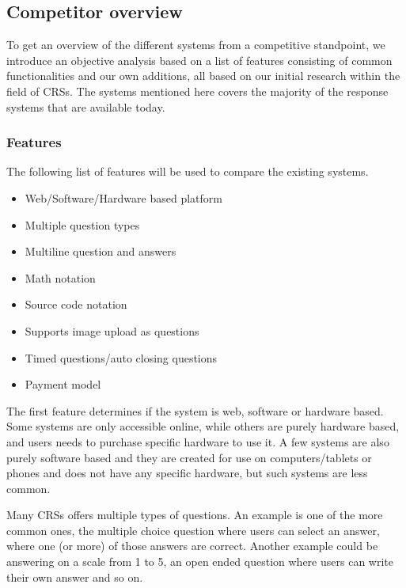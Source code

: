 \subsection{Competitor overview}\label{sec:competitor-overview}
To get an overview of the different systems from a competitive standpoint, we introduce an objective analysis based on a list of features consisting of common functionalities and our own additions, all based on our initial research within the field of CRSs. 
The systems mentioned here covers the majority of the response systems that are available today. %

\subsubsection*{Features}
The following list of features will be used to compare the existing systems.

\begin{itemize}
    \setlength\itemsep{0em}
    \item Web/Software/Hardware based platform
    \item Multiple question types
    \item Multiline question and answers
    \item Math notation
    \item Source code notation
    \item Supports image upload as questions
    \item Timed questions/auto closing questions
    \item Payment model
\end{itemize}

The first feature determines if the system is web, software or hardware based. Some systems are only accessible online, while others are purely hardware based, and users needs to purchase specific hardware to use it. A few systems are also purely software based and they are created for use on computers/tablets or phones and does not have any specific hardware, but such systems are less common.

Many CRSs offers multiple types of questions. An example is one of the more common ones,  the multiple choice question where users can select an answer, where one (or more) of those answers are correct. Another example could be answering on a scale from 1 to 5, an open ended question where users can write their own answer and so on.

